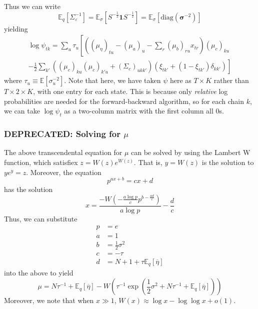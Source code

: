 \documentclass[11pt]{article}
\begin{document}
Thus we can write
\begin{equation}
    \mathbb{E}_q\left[\Sigma_\varepsilon^{-1}\right] =
    \mathbb{E}_\sigma \left[ S^{-\frac{1}{2}} \mathbf{1} S^{-\frac{1}{2}}\right]
    = \mathbb{E}_\sigma \left[\mathrm{diag}(\boldsymbol{\sigma}^{-2}) \right]
\end{equation}
yielding
\begin{multline}
    \log \psi_{tk} = \sum_u \tau_u \left[
    \left((\mu_\eta)_{tu} - (\mu_a)_{u} - \sum_r (\mu_b)_{ru} x_{tr}
    \right)
    (\mu_c)_{ku} \right .\\
    \left.
     -\frac{1}{2} \sum_{k'}((\mu_c)_{ku}(\mu_c)_{k'u} + (\Sigma_c)_{ukk'})(\xi_{tk'} + (1 - \xi_{tk'})\delta_{kk'})\right]
\end{multline}
where $\tau_u \equiv \mathbb{E}[\sigma_u^{-2}]$.
Note that here, we have taken $\psi$ here as $T \times K$ rather than $T \times 2 \times K$, with one entry for each state. This is because only \emph{relative} log probabilities are needed for the forward-backward algorithm, so for each chain $k$, we can take $\log \psi_t$ as a two-column matrix with the first column all 0s.

\subsubsection{DEPRECATED: Solving for $\mu$}
The above transcendental equation for $\mu$ can be solved by using the Lambert W function, which satisfiex $z = W(z)e^{W(z)}$. That is, $y = W(z)$ is the solution to $ye^y = z$. Moreover, the equation
\begin{equation}
    p^{ax + b} = cx + d
\end{equation}
has the solution
\begin{equation}
    x = \frac{-W\left(-\frac{a \log p}{c}
    p^{b - \frac{ad}{c}} \right)}{a \log p} - \frac{d}{c}
\end{equation}
Thus, we can substitute
\begin{align}
    p &= e \\
    a &= 1 \\
    b &= \frac{1}{2} \sigma^2 \\
    c &= -\tau \\
    d &= N + 1 + \tau \mathbb{E}_q[\overline{\eta}]
\end{align}
into the above to yield
\begin{equation}
    \mu = N\tau^{-1} + \mathbb{E}_q[\overline{\eta}] -
    W\left(\tau^{-1} \exp \left(
    \frac{1}{2}\sigma^2 + N\tau^{-1} + \mathbb{E}_q[\overline{\eta}]
    \right)\right)
\end{equation}
Moreover, we note that when $x \gg 1$, $W(x) \approx \log x - \log \log x + o(1)$.
\end{document}
